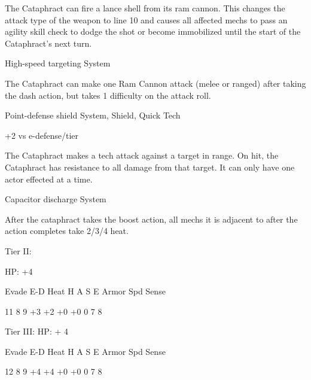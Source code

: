 The Cataphract can fire a lance shell from its ram cannon. This changes the attack type of the
weapon to line 10 and causes all affected mechs to pass an agility skill check to dodge the shot
or become immobilized until the start of the Cataphract’s next turn.


High-speed targeting
System

The Cataphract can make one Ram Cannon attack (melee or ranged) after taking the dash
action, but takes 1 difficulty on the attack roll.


Point-defense shield
System, Shield, Quick Tech

+2 vs e-defense/tier

The Cataphract makes a tech attack against a target in range. On hit, the Cataphract has
resistance to all damage from that target. It can only have one actor effected at a time.


Capacitor discharge
System

After the cataphract takes the boost action, all mechs it is adjacent to after the action completes
take 2/3/4 heat.


Tier II:

HP: +4


          Evade    E-D    Heat     H    A     S     E       Armor        Spd      Sense

          11       8      9        +3   +2    +0    +0      0            7        8

Tier III:
HP: + 4


          Evade    E-D    Heat     H    A     S     E       Armor        Spd      Sense

          12       8      9        +4   +4    +0    +0      0            7        8

